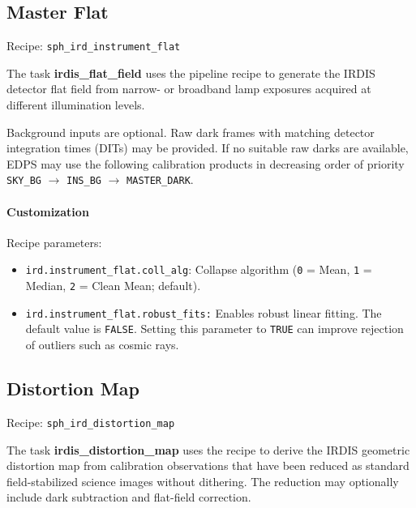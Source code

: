
\subsection{Master Flat}

Recipe: \texttt{sph\_ird\_instrument\_flat}

The task \textbf{irdis\_flat\_field} uses the pipeline recipe to generate the IRDIS detector flat field from narrow- or broadband lamp exposures acquired at different illumination
levels. 

Background inputs are optional. Raw dark frames with matching detector integration times (DITs) may be provided. 
If no suitable raw darks are available, EDPS may use the following calibration products in decreasing order of priority
\texttt{SKY\_BG}
$\rightarrow$
\texttt{INS\_BG}
$\rightarrow$
\texttt{MASTER\_DARK}.


\paragraph{Customization}

Recipe parameters:

\begin{itemize}
\item \texttt{ird.instrument\_flat.coll\_alg}:
Collapse algorithm
(\texttt{0} = Mean,
 \texttt{1} = Median,
 \texttt{2} = Clean Mean; default).
\item \texttt{ird.instrument\_flat.robust\_fits:}
Enables robust linear fitting. The default value is
\texttt{FALSE}. Setting this parameter to \texttt{TRUE} can improve rejection of outliers such as cosmic rays.

\end{itemize}


\subsection{Distortion Map}

Recipe: \texttt{sph\_ird\_distortion\_map}

The task \textbf{irdis\_distortion\_map} uses the recipe to derive the IRDIS geometric distortion
map from calibration observations that have been reduced as standard
field-stabilized science images without dithering. The reduction may optionally
include dark subtraction and flat-field correction.

